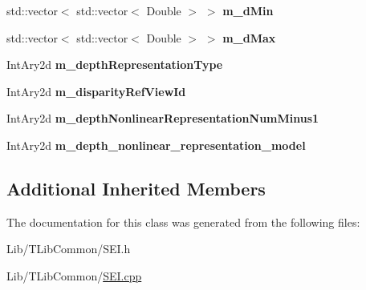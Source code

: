 \begin{DoxyCompactItemize}
std\+::vector$<$ std\+::vector$<$ Double $>$ $>$ {\bfseries m\+\_\+d\+Min}
\item 
\mbox{\label{class_s_e_i_depth_representation_info_ad2f6073368b6b67ab301fc80b6fbdd29}} 
std\+::vector$<$ std\+::vector$<$ Double $>$ $>$ {\bfseries m\+\_\+d\+Max}
\item 
\mbox{\label{class_s_e_i_depth_representation_info_a45acc18ef49a21c145fc756abd3ec885}} 
Int\+Ary2d {\bfseries m\+\_\+depth\+Representation\+Type}
\item 
\mbox{\label{class_s_e_i_depth_representation_info_ad1ebedc2335e13fc175054602d31ae1c}} 
Int\+Ary2d {\bfseries m\+\_\+disparity\+Ref\+View\+Id}
\item 
\mbox{\label{class_s_e_i_depth_representation_info_ae95ba52e085b8037ad2263492e269e8a}} 
Int\+Ary2d {\bfseries m\+\_\+depth\+Nonlinear\+Representation\+Num\+Minus1}
\item 
\mbox{\label{class_s_e_i_depth_representation_info_aaf706310ba3dba118b35bc0af4244ab2}} 
Int\+Ary2d {\bfseries m\+\_\+depth\+\_\+nonlinear\+\_\+representation\+\_\+model}
\end{DoxyCompactItemize}
\subsection*{Additional Inherited Members}


The documentation for this class was generated from the following files\+:\begin{DoxyCompactItemize}
\item 
Lib/\+T\+Lib\+Common/S\+E\+I.\+h\item 
Lib/\+T\+Lib\+Common/\hyperlink{_s_e_i_8cpp}{S\+E\+I.\+cpp}\end{DoxyCompactItemize}
